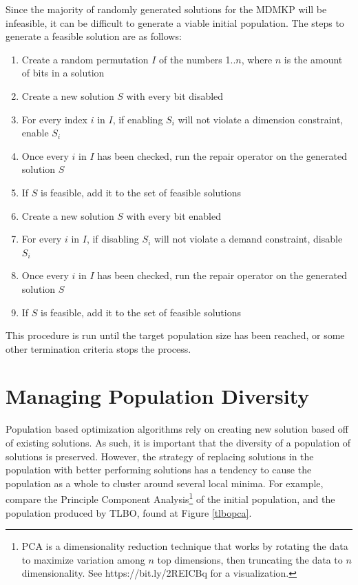 \documentclass[11pt, letterpaper, onecolumn]{article}
\begin{document}
Since the majority of randomly generated solutions for the MDMKP will be infeasible, it can be difficult to generate a viable initial population. The steps to generate a feasible solution are as follows:

\begin{enumerate}
\item Create a random permutation $I$ of the numbers 1..$n$, where $n$ is the amount of bits in a solution
\item Create a new solution $S$ with every bit disabled
\item For every index $i$ in $I$, if enabling $S_i$ will not violate a dimension constraint, enable $S_i$
\item Once every $i$ in $I$ has been checked, run the repair operator on the generated solution $S$
\item If $S$ is feasible, add it to the set of feasible solutions
\item Create a new solution $S$ with every bit enabled
\item For every $i$ in $I$, if disabling $S_i$ will not violate a demand constraint, disable $S_i$
\item Once every $i$ in $I$ has been checked, run the repair operator on the generated solution $S$
\item If $S$ is feasible, add it to the set of feasible solutions
\end{enumerate}

This procedure is run until the target population size has been reached, or some other termination criteria stops the process. 

\section{Managing Population Diversity}

Population based optimization algorithms rely on creating new solution based off of existing solutions. As such, it is important that the diversity of a population of solutions is preserved. However, the strategy of replacing solutions in the population with better performing solutions has a tendency to cause the population as a whole to cluster around several local minima. For example, compare the Principle Component Analysis\footnote{PCA is a dimensionality reduction technique that works by rotating the data to maximize variation among $n$ top dimensions, then truncating the data to $n$ dimensionality. See https://bit.ly/2REICBq for a visualization.} of the initial population, and the population produced by TLBO, found at Figure \ref{tlbopca}.
\end{document}
